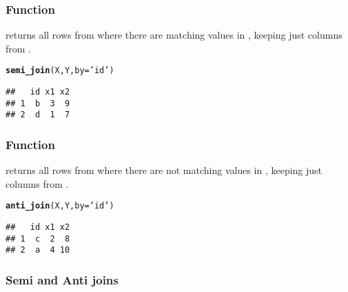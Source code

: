 \documentclass[12pt]{beamer}\usepackage[]{graphicx}\usepackage[]{color}
\makeatletter
\newcommand{\hlstr}[1]{\textcolor[rgb]{0.192,0.494,0.8}{#1}}%
\newcommand{\hlstd}[1]{\textcolor[rgb]{0.345,0.345,0.345}{#1}}%
\newcommand{\hlkwc}[1]{\textcolor[rgb]{0.333,0.667,0.333}{#1}}%
\newcommand{\hlkwd}[1]{\textcolor[rgb]{0.737,0.353,0.396}{\textbf{#1}}}%
\newenvironment{kframe}{%
 \def\at@end@of@kframe{}%
 \ifinner\ifhmode%
  \def\at@end@of@kframe{\end{minipage}}%
  \begin{minipage}{\columnwidth}%
 \fi\fi%
 \def\FrameCommand##1{\hskip\@totalleftmargin \hskip-\fboxsep
 \colorbox{shadecolor}{##1}\hskip-\fboxsep
     \hskip-\linewidth \hskip-\@totalleftmargin \hskip\columnwidth}%
 \MakeFramed {\advance\hsize-\width
   \@totalleftmargin\z@ \linewidth\hsize
   \@setminipage}}%
 {\par\unskip\endMakeFramed%
 \at@end@of@kframe}
\newenvironment{knitrout}{}{} %
\makeatother
\begin{document}
\begin{frame}[fragile]
\frametitle{Function }

 returns all rows from  where there are matching values in , keeping just columns from .
\begin{knitrout}\footnotesize
{}\color{fgcolor}\begin{kframe}
\begin{alltt}
\hlkwd{semi_join}\hlstd{(X, Y,} \hlkwc{by} \hlstd{=} \hlstr{'id'}\hlstd{)}
\end{alltt}
\begin{verbatim}
##   id x1 x2
## 1  b  3  9
## 2  d  1  7
\end{verbatim}
\end{kframe}
\end{knitrout}

\end{frame}


\begin{frame}[fragile]
\frametitle{Function }

 returns all rows from  where there are not matching values in , keeping just columns from .
\begin{knitrout}\footnotesize
{}\color{fgcolor}\begin{kframe}
\begin{alltt}
\hlkwd{anti_join}\hlstd{(X, Y,} \hlkwc{by} \hlstd{=} \hlstr{'id'}\hlstd{)}
\end{alltt}
\begin{verbatim}
##   id x1 x2
## 1  c  2  8
## 2  a  4 10
\end{verbatim}
\end{kframe}
\end{knitrout}

\end{frame}


\begin{frame}[fragile]
\frametitle{Semi and Anti joins}
\begin{center}
\end{center}
\end{frame}

\end{document}
